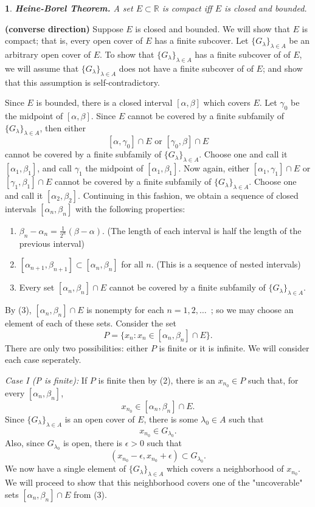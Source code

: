 \documentclass[11pt]{article}
\makeatletter
\renewenvironment{proof}{{\bfseries Proof}}{\qed}
\renewenvironment{proof}[1][\bfseries \proofname]{\par
  \pushQED{\qed}%
  \normalfont \topsep6\p@\@plus6\p@\relax
  \trivlist
  \item[\hskip\labelsep
        \scshape
    #1\@addpunct{}]\ignorespaces
}{%
  \popQED\endtrivlist\@endpefalse
}
\newtheorem{theorem}{}
\newcommand{\R}{\mathbb{R}}
\newcommand{\glambda}{\{G_\lambda\}_{\lambda \in A}}
\makeatother
\begin{document}
	
\begin{theorem} 
\textbf{Heine-Borel Theorem.} A set $E \subset \R$ is compact iff $E$ is closed and bounded.
\end{theorem}

\begin{proof} \textbf{(converse direction)}
Suppose $E$ is closed and bounded. We will show that $E$ is compact; that is, every open cover of $E$ has a finite subcover. Let $\glambda$ be an arbitrary open cover of $E$. To show that $\glambda$ has a finite subcover of of $E$, we will assume that $\glambda$ does not have a finite subcover of of $E$; and show that this assumption is self-contradictory. 

Since $E$ is bounded, there is a closed interval $[\alpha, \beta]$ which covers $E$. Let $\gamma_0$ be the midpoint of $[\alpha, \beta]$. Since $E$ cannot be covered by a finite subfamily of $\glambda$, then either $$[\alpha, \gamma_0] \cap E \text{ or } [\gamma_0, \beta] \cap E$$ cannot be covered by a finite subfamily of $\glambda$. Choose one and call it $[\alpha_1, \beta_1]$, and call $\gamma_1$ the midpoint of $[\alpha_1, \beta_1]$. Now again, either $[\alpha_1, \gamma_1] \cap E$ or $[\gamma_1, \beta_1] \cap E$ cannot be covered by a finite subfamily of $\glambda$. Choose one and call it $[\alpha_2, \beta_2]$. Continuing in this fashion, we obtain a sequence of closed intervals $[\alpha_n, \beta_n]$ with the following properties:
\begin{enumerate}
	\item $\beta_n - \alpha_n = \frac{1}{2^n}(\beta - \alpha)$. (The length of each interval is half the length of the previous interval)
	\item $[\alpha_{n+1}, \beta_{n+1}] \subset [\alpha_{n}, \beta_{n}]$ for all $n$. (This is a sequence of nested intervals)
	\item Every set $[\alpha_{n}, \beta_{n}] \cap E$ cannot be covered by a finite subfamily of $\glambda$.
\end{enumerate}
%
\begin{figure}

\end{figure}
%
By (3), $[\alpha_{n}, \beta_{n}] \cap E$  is nonempty for each $n = 1,2, \ldots \,$ ; so we may choose an element of each of these sets. Consider the set $$P = \{x_n: x_n \in [\alpha_{n}, \beta_{n}] \cap E \}.$$
There are only two possibilities: either $P$ is finite or it is infinite. We will consider each case seperately.

\textit{Case I (P is finite):} If $P$ is finite then by (2), there is an $x_{n_0} \in P$ such that, for every $[\alpha_{n}, \beta_{n}]$, 
$$ x_{n_0} \in [\alpha_{n}, \beta_{n}] \cap E.$$
Since $\glambda$ is an open cover of $E$, there is some $\lambda_0 \in A$ such that 
$$ x_{n_0} \in G_{\lambda_0}.$$
Also, since $G_{\lambda_0}$ is open, there is $\epsilon > 0$ such that 
$$(x_{n_0} - \epsilon, x_{n_0} + \epsilon) \subset G_{\lambda_0}.$$
We now have a single element of $\glambda$ which covers a neighborhood of $x_{n_0}$. We will proceed to show that this neighborhood covers one of the "uncoverable" sets $[\alpha_{n}, \beta_{n}] \cap E$ from (3).


\end{proof}
\end{document}
